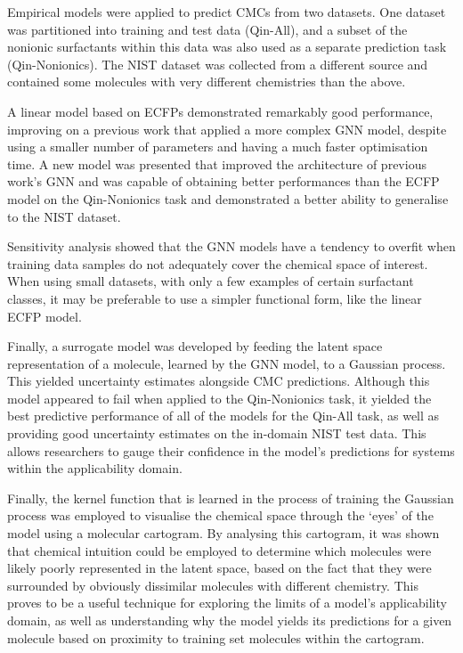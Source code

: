 Empirical models were applied to predict CMCs from two datasets. One dataset was partitioned into training and test data (Qin-All), and a subset of the nonionic surfactants within this data was also used as a separate prediction task
(Qin-Nonionics). The NIST dataset was collected from a different source and contained some molecules with very different chemistries than the above.

A linear model based on ECFPs demonstrated remarkably good performance, improving on a previous work \cite{qinPredictingCriticalMicelle2021} that applied a more complex GNN model, despite using a smaller number of parameters and having a much faster optimisation time. A new model was presented that improved the architecture of previous work's GNN and was capable of obtaining better performances than the ECFP model on the Qin-Nonionics task and
demonstrated a better ability to generalise to the NIST dataset.

Sensitivity analysis showed that the GNN models have a tendency to overfit when
training data samples do not adequately cover the chemical space of interest.
When using small datasets, with only a few examples of certain surfactant
classes, it may be preferable to use a simpler functional form, like the linear
ECFP model.

Finally, a surrogate model was developed by feeding the latent space
representation of a molecule, learned by the GNN model, to a Gaussian process.
This yielded uncertainty estimates alongside CMC predictions. Although this
model appeared to fail when applied to the Qin-Nonionics task, it yielded the
best predictive performance of all of the models for the Qin-All task, as well
as providing good uncertainty estimates on the in-domain NIST test data. This
allows researchers to gauge their confidence in the model's predictions for
systems within the applicability domain.

Finally, the kernel function that is learned in the process of training the
Gaussian process was employed to visualise the chemical space through the `eyes'
of the model using a molecular cartogram. By analysing this cartogram, it was
shown that chemical intuition could be employed to determine which molecules
were likely poorly represented in the latent space, based on the fact that they
were surrounded by obviously dissimilar molecules with different chemistry. This
proves to be a useful technique for exploring the limits of a model's
applicability domain, as well as understanding why the model yields its
predictions for a given molecule based on proximity to training set molecules
within the cartogram.